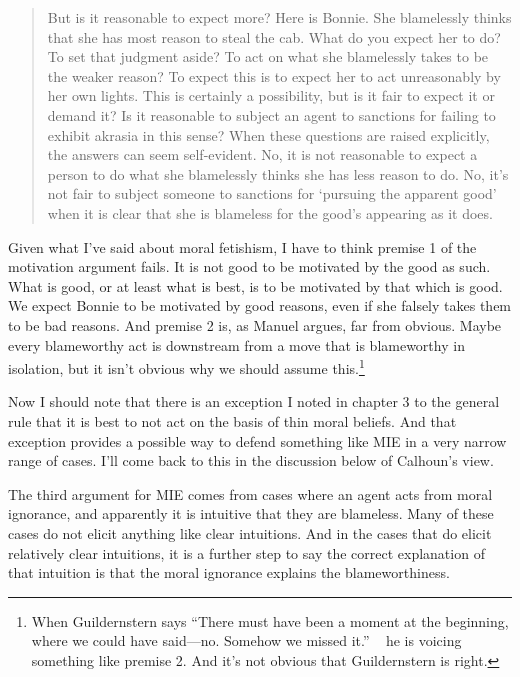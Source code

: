 \begin{quote}
But is it reasonable to expect more? Here is \gls{Bonnie}. She blamelessly thinks that she has most reason to steal the cab. What do you expect her to do? To set that judgment aside? To act on what she blamelessly takes to be the weaker reason? To expect this is to expect her to act unreasonably by her own lights. This is certainly a possibility, but is it fair to expect it or demand it? Is it reasonable to subject an agent to sanctions for failing to exhibit akrasia in this sense? When these questions are raised explicitly, the answers can seem self-evident. No, it is not reasonable to expect a person to do what she blamelessly thinks she has less reason to do. No, it's not fair to subject someone to sanctions for `pursuing the apparent good' when it is clear that she is blameless for the good's appearing as it does. ~\citep[79-80]{Rosen2003}
\end{quote}
Given what I've said about moral fetishism, I have to think premise 1 of the motivation argument fails. It is not good to be motivated by the good as such. What is good, or at least what is best, is to be motivated by that which is good. We expect \gls{Bonnie} to be motivated by good reasons, even if she falsely takes them to be bad reasons. And premise 2 is, as Manuel \citet{Vargas2005} argues, far from obvious. Maybe every blameworthy act is downstream from a move that is blameworthy in isolation, but it isn't obvious why we should assume this.\footnote{When Guildernstern says ``There must have been a moment at the beginning, where we could have said---no. Somehow we missed it.'' ~\citep[125]{Stoppard1967} he is voicing something like premise 2. And it's not obvious that Guildernstern is right.}

Now I should note that there is an exception I noted in chapter 3 to the general rule that it is best to not act on the basis of thin moral beliefs. And that exception provides a possible way to defend something like MIE in a very narrow range of cases. I'll come back to this in the discussion below of Calhoun's view.

The third argument for MIE comes from cases where an agent acts from moral ignorance, and apparently it is intuitive that they are blameless. Many of these cases do not elicit anything like clear intuitions. And in the cases that do elicit relatively clear intuitions, it is a further step to say the correct explanation of that intuition is that the moral ignorance explains the blameworthiness.

